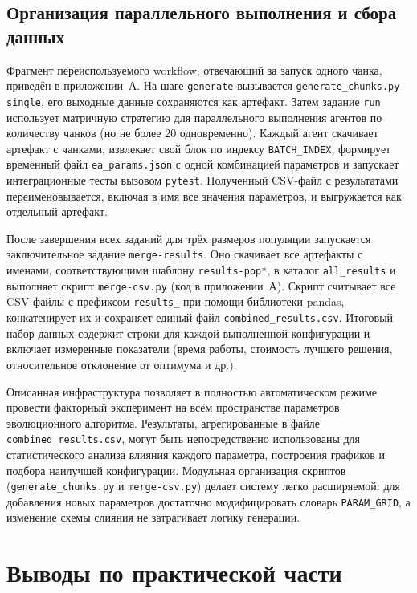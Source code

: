 \documentclass[732]{studrep}
\theoremstyle{nonumberplain}
\begin{document}
\subsection{Организация параллельного выполнения и сбора данных}

Фрагмент переиспользуемого workflow, отвечающий за запуск одного чанка, приведён в приложении~А. На шаге \texttt{generate} вызывается \texttt{generate\_chunks.py single}, его выходные данные сохраняются как артефакт. Затем задание \texttt{run} использует матричную стратегию для параллельного выполнения агентов по количеству чанков (но не более 20 одновременно). Каждый агент скачивает артефакт с чанками, извлекает свой блок по индексу \texttt{BATCH\_INDEX}, формирует временный файл \texttt{ea\_params.json} с одной комбинацией параметров и запускает интеграционные тесты вызовом \texttt{pytest}. Полученный CSV-файл с результатами переименовывается, включая в имя все значения параметров, и выгружается как отдельный артефакт.

После завершения всех заданий для трёх размеров популяции запускается заключительное задание \texttt{merge-results}. Оно скачивает все артефакты с именами, соответствующими шаблону \texttt{results-pop*}, в каталог \texttt{all\_results} и выполняет скрипт \texttt{merge-csv.py} (код в приложении~А). Скрипт считывает все CSV-файлы с префиксом \texttt{results\_} при помощи библиотеки pandas, конкатенирует их и сохраняет единый файл \texttt{combined\_results.csv}. Итоговый набор данных содержит строки для каждой выполненной конфигурации и включает измеренные показатели (время работы, стоимость лучшего решения, относительное отклонение от оптимума и др.).

Описанная инфраструктура позволяет в полностью автоматическом режиме провести факторный эксперимент на всём пространстве параметров эволюционного алгоритма. Результаты, агрегированные в файле \texttt{combined\_results.csv}, могут быть непосредственно использованы для статистического анализа влияния каждого параметра, построения графиков и подбора наилучшей конфигурации. Модульная организация скриптов (\texttt{generate\_chunks.py} и \texttt{merge-csv.py}) делает систему легко расширяемой: для добавления новых параметров достаточно модифицировать словарь \texttt{PARAM\_GRID}, а изменение схемы слияния не затрагивает логику генерации.

\section{Выводы по практической части}
\label{sec:practical_conclusions}
\end{document}
